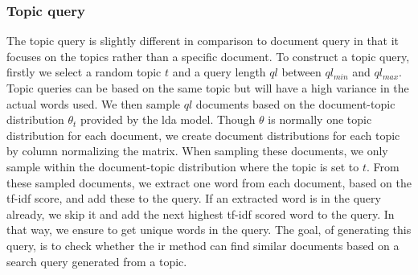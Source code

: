 \subsubsection{Topic query}\label{subsec:query_gen_top}
The topic query is slightly different in comparison to document query in that it focuses on the topics rather than a specific document.
To construct a topic query, firstly we select a random topic $t$ and a query length $ql$ between $ql_{min}$ and $ql_{max}$.
Topic queries can be based on the same topic but will have a high variance in the actual words used.
We then sample $ql$ documents based on the document-topic distribution $\theta_t$ provided by the \gls{lda} model.
Though $\theta$ is normally one topic distribution for each document, we create document distributions for each topic by column normalizing the matrix.
When sampling these documents, we only sample within the document-topic distribution where the topic is set to $t$.
From these sampled documents, we extract one word from each document, based on the \gls{tf-idf} score, and add these to the query.
If an extracted word is in the query already, we skip it and add the next highest \gls{tf-idf} scored word to the query.
In that way, we ensure to get unique words in the query.
The goal, of generating this query, is to check whether the \gls{ir} method can find similar documents based on a search query generated from a topic.

 
